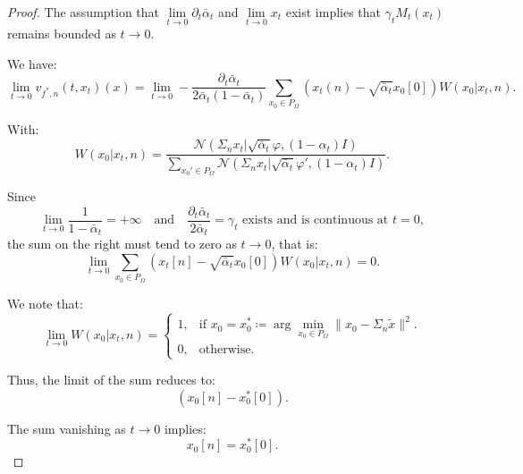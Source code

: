 \documentclass[a4paper,10pt]{article}
\begin{document}
\begin{proof}
    The assumption that \( \lim\limits_{t \to 0} \partial_t \bar \alpha_t \) and \( \lim\limits_{t \to 0} x_t \) exist implies that \( \gamma_t M_t(x_t) \) remains bounded as \( t \to 0 \).

    We have:
    \[
        \lim\limits_{t \to 0} v_{f^*,n}(t,x_t) (x) = \lim\limits_{t \to 0} - \frac{\partial_t \bar \alpha_t}{2\bar  \alpha_t (1 - \bar \alpha_t)} \sum_{x_0 \in P_{\Omega}} \left(x_t(n) - \sqrt{\bar{\alpha}_t} x_0[0]\right) W(x_0|x_t,n).
    \]

    With:
    \[
        W(x_0|x_t,n) = \frac{\mathcal{N}(\Sigma_n x_t | \sqrt{\bar{\alpha}_t} \varphi, (1 - \alpha_t)I)}
        {\sum\limits_{x_0' \in P_{\Omega}} \mathcal{N}(\Sigma_n x_t | \sqrt{\bar{\alpha}_t} \varphi', (1 - \alpha_t)I)}.
    \]

    Since 
    \[
        \lim\limits_{t \to 0} \frac{1}{1 - \bar \alpha_t} = +\infty 
        \quad \text{and} \quad 
        \frac{\partial_t \bar \alpha_t}{2 \bar \alpha_t} = \gamma_t \text{ exists and is continuous at } t=0,
    \]
    the sum on the right must tend to zero as \( t \to 0 \), that is:
    \[
        \lim\limits_{t \to 0} \sum_{x_0 \in P_{\Omega}} \left(x_t[n] - \sqrt{\bar{\alpha}_t} x_0[0]\right) W(x_0|x_t,n) = 0.
    \]

    We note that:
    \[
        \lim\limits_{t \to 0} W(x_0|x_t,n) =
        \begin{cases} 
        1, & \text{if } x_0 = x_0^* \coloneqq \arg \min_{x_0 \in P_{\Omega}} \|x_0 - \Sigma_n \tilde{x}\|^2. \\
        0, & \text{otherwise}.
        \end{cases}
    \]

    Thus, the limit of the sum reduces to:
    \[
        (x_0[n] - x_0^*[0]).
    \]

    The sum vanishing as \( t \to 0 \) implies:
    \[
        x_0[n] = x_0^*[0].
    \]
\end{proof}
\end{document}
